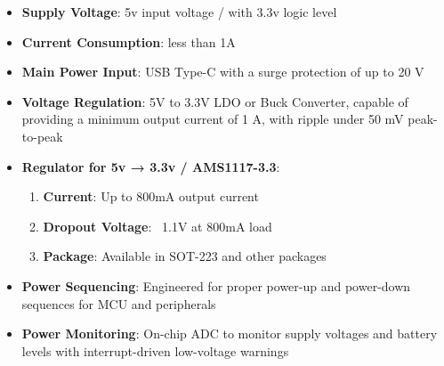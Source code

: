\documentclass[conference]{IEEEtran}
\begin{document}
\begin{enumerate}[label=\arabic*.]
\begin{enumerate}[label=\alph*.]
\begin{itemize}
\item \textbf{Supply Voltage}: 5v input voltage / with 3.3v logic level\\
\item \textbf{Current Consumption}: less than 1A\\
\item \textbf{Main Power Input}: USB Type-C with a surge protection of up to 20 V\\
\item \textbf{Voltage Regulation}: 5V to 3.3V LDO or Buck Converter, capable of providing a minimum output current of 1 A, with ripple under 50 mV peak-to-peak\\
\item \textbf{Regulator for 5v → 3.3v / AMS1117-3.3}:\\
\begin{enumerate}[label=\roman*.]
\item \textbf{Current}: Up to 800mA output current\\
\item \textbf{Dropout Voltage}: ~1.1V at 800mA load\\
\item \textbf{Package}: Available in SOT-223 and other packages\\
\end{enumerate}
\item \textbf{Power Sequencing}: Engineered for proper power-up and power-down sequences for MCU and peripherals\\
\item \textbf{Power Monitoring}: On-chip ADC to monitor supply voltages and battery levels with interrupt-driven low-voltage warnings\\
\end{itemize}


\end{enumerate}
\end{enumerate}
\end{document}
